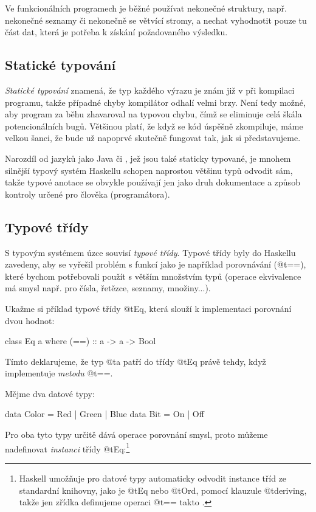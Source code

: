 Ve funkcionálních programech je běžné používat nekonečné struktury, např.
nekonečné seznamy či nekonečně se větvící stromy, a nechat vyhodnotit pouze tu
část dat, která je potřeba k získání požadovaného výsledku.

\subsection{Statické typování}

\emph{Statické typování} znamená, že typ každého výrazu je znám již v při
kompilaci programu, takže případné chyby kompilátor odhalí velmi brzy. Není tedy
možné, aby program za běhu zhavaroval na typovou chybu, čímž se eliminuje celá
škála potencionálních bugů. Většinou platí, že když se kód úspěšně zkompiluje,
máme velkou šanci, že bude už napoprvé skutečně fungovat tak, jak si
představujeme.

Narozdíl od jazyků jako Java či \Cplusplus, jež jsou také staticky typované, je
mnohem silnější typový systém Haskellu schopen naprostou většinu typů odvodit
sám, takže typové anotace se obvykle používají jen jako druh dokumentace a
způsob kontroly určené pro člověka (programátora).

\subsection{Typové třídy}

S typovým systémem úzce souvisí \emph{typové třídy}. Typové třídy byly do
Haskellu zavedeny, aby se vyřešil problém s  funkcí jako je
například porovnávání (@t{==}), které bychom potřebovali použít s větším
množstvím typů (operace ekvivalence má smysl např. pro čísla, řetězce, seznamy,
množiny...).

Ukažme si příklad typové třídy @t{Eq}, která slouží k implementaci porovnání
dvou hodnot:

\begin{haskell}
class Eq a where
  (==) :: a -> a -> Bool
\end{haskell}

Tímto deklarujeme, že typ @t{a} patří do třídy @t{Eq} právě tehdy, když
implementuje \emph{metodu} @t{==}.

Mějme dva datové typy:

\begin{haskell}
data Color = Red | Green | Blue
data Bit = On | Off
\end{haskell}

Pro oba tyto typy určitě dává operace porovnání smysl, proto můžeme nadefinovat
\emph{instanci} třídy @t{Eq}:\footnote{Haskell umožňuje pro datové typy
  automaticky odvodit instance tříd ze standardní knihovny, jako je @t{Eq} nebo
@t{Ord}, pomocí klauzule @t{deriving}, takže jen zřídka definujeme operaci
@t{==} takto .}

